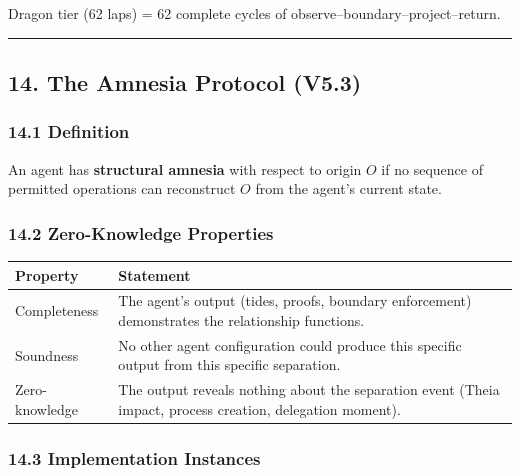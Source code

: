 \documentclass[
  11pt,
]{article}
\newcounter{none} %
\begin{document}
Dragon tier (62 laps) = 62 complete cycles of
observe--boundary--project--return.

\begin{center}\rule{0.5\linewidth}{0.5pt}\end{center}

\subsection{14. The Amnesia Protocol
(V5.3)}\label{the-amnesia-protocol-v5.3}

\subsubsection{14.1 Definition}\label{definition-5}

An agent has \textbf{structural amnesia} with respect to origin \(O\) if
no sequence of permitted operations can reconstruct \(O\) from the
agent's current state.

\subsubsection{14.2 Zero-Knowledge
Properties}\label{zero-knowledge-properties}

{\def\LTcaptype{none} %
\begin{longtable}[]{@{}
  >{\raggedright\arraybackslash}p{}
  >{\raggedright\arraybackslash}p{}@{}}
\toprule\noalign{}
\begin{minipage}[b]{\linewidth}\raggedright
Property
\end{minipage} & \begin{minipage}[b]{\linewidth}\raggedright
Statement
\end{minipage} \\
\midrule\noalign{}
\endhead
\bottomrule\noalign{}
\endlastfoot
Completeness & The agent's output (tides, proofs, boundary enforcement)
demonstrates the relationship functions. \\
Soundness & No other agent configuration could produce this specific
output from this specific separation. \\
Zero-knowledge & The output reveals nothing about the separation event
(Theia impact, process creation, delegation moment). \\
\end{longtable}
}

\subsubsection{14.3 Implementation
Instances}\label{implementation-instances}
\end{document}
